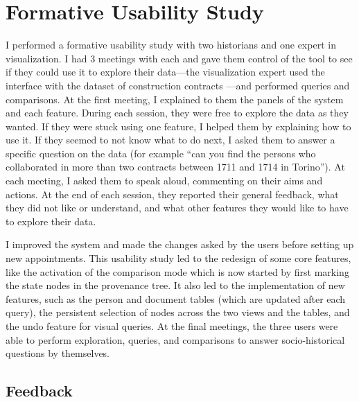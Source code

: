 \section{Formative Usability Study}\label{sec:combinet-usability}


I performed a formative usability study with two historians and one expert in visualization.
I had 3 meetings with each and gave them control of the tool to see if they could use it to explore their data---the visualization expert used the interface with the dataset of construction contracts \pascal---and performed queries and comparisons.
At the first meeting, I explained to them the panels of the system and each feature.
During each session, they were free to explore the data as they wanted.
If they were stuck using one feature, I helped them by explaining how to use it.
If they seemed to not know what to do next, I asked them to answer a specific question on the data (for example ``can you find the persons who collaborated in more than two contracts between 1711 and 1714 in Torino'').
At each meeting, I asked them to speak aloud, commenting on their aims and actions.
At the end of each session, they reported their general feedback, what they did not like or understand, and what other features they would like to have to explore their data.

I improved the system and made the changes asked by the users before setting up new appointments.
This usability study led to the redesign of some core features, like the activation of the comparison mode which is now started by first marking the state nodes in the provenance tree.
It also led to the implementation of new features, such as the person and document tables (which are updated after each query), the persistent selection of nodes across the two views and the tables, and the undo feature for visual queries.
At the final meetings, the three users were able to perform exploration, queries, and comparisons to answer socio-historical questions by themselves.


\subsection{Feedback}

